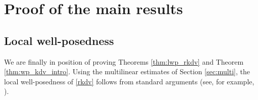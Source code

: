 \documentclass[%
11pt,  reqno]{amsart}
\newcommand{\5}{\textup{V}}
\newcommand{\FL}{\mathcal{F} L}
\newcommand{\dl}{\delta}
\newtheorem{proposition}[theorem]{Proposition}
\theoremstyle{remark}
\newcommand{\R}{\mathbb{R}}
\newcommand{\TT}{\mathcal{T}}
\newcommand{\bfrak}{\mathfrak{b}}
\newcommand{\gfrak}{\mathfrak{g}}
\newcommand{\ta}{\theta}
\numberwithin{equation}{section}
\numberwithin{theorem}{section}
\newcommand{\NN}{\mathrm{N}}
\begin{document}




\section{Proof of the main results}\label{sec:lwp}

\subsection{Local well-posedness}
We are finally in position of proving Theorems \ref{thm:lwp_rkdv} and Theorem \ref{thm:wp_kdv_intro}.
Using the multilinear estimates of Section \ref{sec:multi}, the local well-posedness of \eqref{rkdv} follows from standard arguments (see, for example, \cite{Grunrock_mkdv, HerrGrunrock_FL}). 



\end{document}
